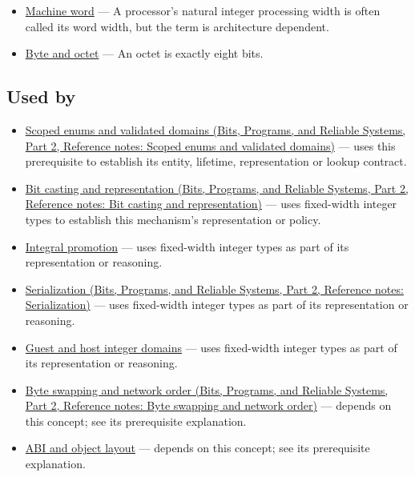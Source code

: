 \hypertarget{appendix-cc04044b5782-prerequisites}{}

\begin{itemize}
\tightlist
\item
  \hyperref[appendix-d67a19507dc5]{Machine word} --- A processor's natural integer processing width is often called its word width, but the term is architecture dependent.
\item
  \hyperref[appendix-5bee2df85484]{Byte and octet} --- An octet is exactly eight bits.
\end{itemize}

\subsection{Used by}\label{appendix-cc04044b5782-used-by}

\hypertarget{appendix-cc04044b5782-used-by}{}

\begin{itemize}
\tightlist
\item
  \href{../01-Bits-Programs-and-Reliable-Systems-P02/main.pdf\#appendix-23640fcee147}{Scoped enums and validated domains (Bits, Programs, and Reliable Systems, Part 2, Reference notes: Scoped enums and validated domains)} --- uses this prerequisite to establish its entity, lifetime, representation or lookup contract.
\item
  \href{../01-Bits-Programs-and-Reliable-Systems-P02/main.pdf\#appendix-34ee45f161c1}{Bit casting and representation (Bits, Programs, and Reliable Systems, Part 2, Reference notes: Bit casting and representation)} --- uses fixed-width integer types to establish this mechanism's representation or policy.
\item
  \hyperref[appendix-45303d03796a]{Integral promotion} --- uses fixed-width integer types as part of its representation or reasoning.
\item
  \href{../01-Bits-Programs-and-Reliable-Systems-P02/main.pdf\#appendix-91d09ebed979}{Serialization (Bits, Programs, and Reliable Systems, Part 2, Reference notes: Serialization)} --- uses fixed-width integer types as part of its representation or reasoning.
\item
  \hyperref[appendix-33e7a011b684]{Guest and host integer domains} --- uses fixed-width integer types as part of its representation or reasoning.
\item
  \href{../01-Bits-Programs-and-Reliable-Systems-P02/main.pdf\#appendix-11ba36693aa2}{Byte swapping and network order (Bits, Programs, and Reliable Systems, Part 2, Reference notes: Byte swapping and network order)} --- depends on this concept; see its prerequisite explanation.
\item
  \hyperref[appendix-c4ac6bb0fff8]{ABI and object layout} --- depends on this concept; see its prerequisite explanation.
\end{itemize}

